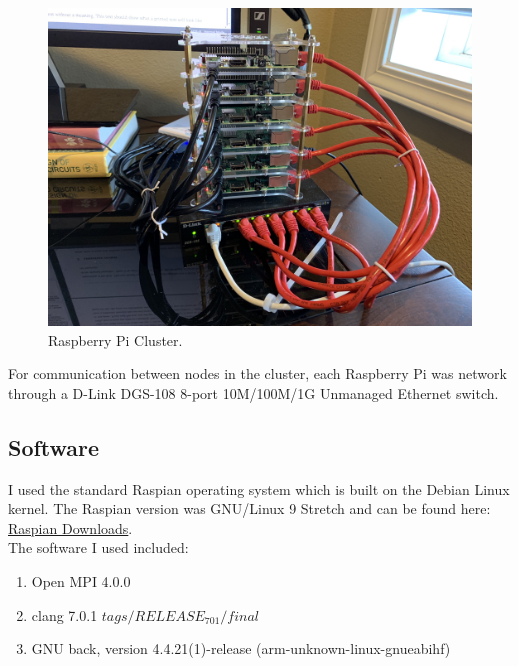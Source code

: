 \documentclass[11pt, a4paper]{article} %
\begin{document}
\begin{figure}
  \includegraphics[width=\linewidth]{picluster.jpg}
  \caption{Raspberry Pi Cluster.}
  \label{fig:Raspberry Pi Cluster}
\end{figure}

For communication between nodes in the cluster, each Raspberry Pi was network through a D-Link DGS-108 8-port 10M/100M/1G Unmanaged Ethernet switch.

\subsection{Software}
I used the standard Raspian operating system which is built on the Debian Linux kernel. The Raspian version was GNU/Linux 9 Stretch and can be found here: \href{https://www.raspberrypi.org/downloads/raspbian/}{Raspian Downloads}. \\
\linespread{1}
The software I used included: \\
\begin{enumerate}
\item Open MPI 4.0.0
\item clang 7.0.1 \(tags/RELEASE_701/final\)
\item GNU back, version 4.4.21(1)-release (arm-unknown-linux-gnueabihf)
\end{enumerate}

\linespread{1.5}

\end{document}
